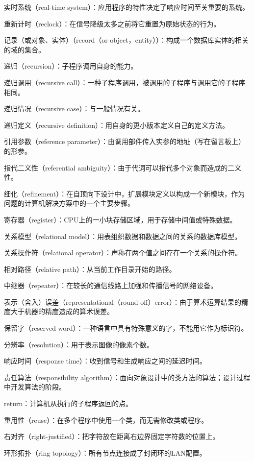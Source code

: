 实时系统（real-time system）：应用程序的特性决定了响应时间至关重要的系统。

重新计时（reclock）：在信号降级太多之前将它重置为原始状态的行为。

记录（或对象、实体）（record（or object，entity））：构成一个数据库实体的相关的域的集合。

递归（recursion）：子程序调用自身的能力。

递归调用（recursive call）：一种子程序调用，被调用的子程序与调用它的子程序相同。

递归情况（recursive case）：与一般情况有关。

递归定义（recursive definition）：用自身的更小版本定义自己的定义方法。

引用参数（reference parameter）：由调用部件传入实参的地址（写在留言板上）的形参。

指代二义性（referential ambiguity）：由于代词可以指代多个对象而造成的二义性。

细化（refinement）：在自顶向下设计中，扩展模块定义以构成一个新模块，作为问题的计算机解决方案中的一个主要步骤。

寄存器（register）：CPU上的一小块存储区域，用于存储中间值或特殊数据。

关系模型（relational model）：用表组织数据和数据之间的关系的数据库模型。

关系操作符（relational operator）：声称在两个值之间存在一个关系的操作符。

相对路径（relative path）：从当前工作目录开始的路径。

中继器（repeater）：在较长的通信线路上加强和传播信号的网络设备。

表示（舍入）误差（representational（round-off）error）：由于算术运算结果的精度大于机器的精度造成的算术误差。

保留字（reserved word）：一种语言中具有特殊意义的字，不能用它作为标识符。

分辨率（resolution）：用于表示图像的像素个数。

响应时间（response time）：收到信号和生成响应之间的延迟时间。

责任算法（responsibility algorithm）：面向对象设计中的类方法的算法；设计过程中开发算法的阶段。

return：计算机从执行的子程序返回的点。

重用性（reuse）：在多个程序中使用一个类，而无需修改类或程序。

右对齐（right-justified）：把字符放在距离右边界固定字符数的位置上。

环形拓扑（ring topology）：所有节点连接成了封闭环的LAN配置。


